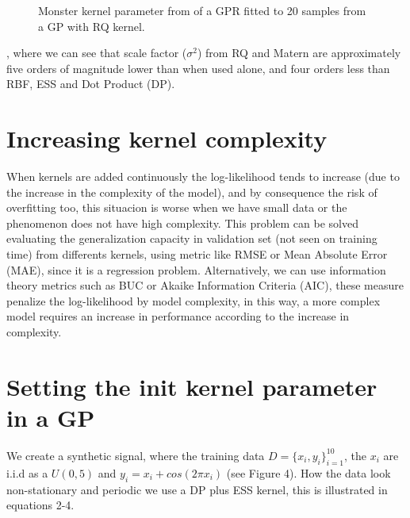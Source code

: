 \documentclass{article}
\begin{document}
\def\grayboxtext[#1,#2]#3{
        \node[fill=gray!80, text width=22em, draw=black!80, rounded corners, align=justify, below=#1] (#2) {#3}; 
}
\begin{figure}
\caption{Monster kernel parameter from of a GPR fitted to 20 samples from a GP with RQ kernel.}
\end{figure}

, where we can see that scale factor ($\sigma^{2}$) from RQ and Matern are approximately five orders of magnitude lower than when used alone, and four orders less than RBF, ESS and Dot Product (DP).\\

\section{Increasing kernel complexity}

When kernels are added continuously the log-likelihood tends to increase (due to the increase in the complexity of the model), and by consequence the risk of overfitting too, this situacion is worse when we have small data or the phenomenon does not have high complexity. This problem can be solved evaluating the generalization capacity in validation set (not seen on training time) from differents kernels, using metric like RMSE or Mean Absolute Error (MAE), since it is a regression problem. Alternatively, we can use information theory metrics such as BUC or Akaike Information Criteria (AIC), these measure penalize the log-likelihood by model complexity, in this way, a more complex model requires an increase in performance according to the increase in complexity.\\

\section{Setting the init kernel parameter in a GP}

We create a synthetic signal, where the training data $D = \{x_{i},y_{i}\}_{i=1}^{10}$, the $x_{i}$ are i.i.d as a $U(0,5)$ and $y_{i} = x_{i}+cos(2\pi x_{i})$ (see Figure 4). How the data look non-stationary and periodic we use a DP plus ESS kernel, this is illustrated in equations 2-4. 
\end{document}
